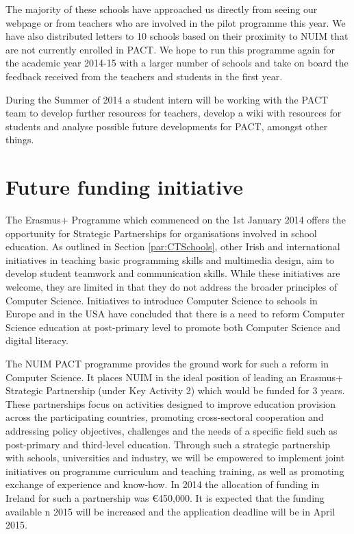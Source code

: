 \documentclass[a4paper]{article}
\begin{document}
The majority of these schools have approached us directly from seeing our webpage or from teachers who are involved in the pilot programme this year. We have also distributed letters to 10 schools based on their proximity to NUIM that are not currently enrolled in PACT. We hope to run this programme again for the academic year 2014-15 with a larger number of schools and take on board the feedback received from the teachers and students in the first year.

During the Summer of 2014 a student intern will be working with the PACT team to develop further resources for teachers, develop a wiki with resources for students and analyse possible future developments for PACT, amongst other things.


\section{Future funding initiative} \label{Sect:FutFunding}
The Erasmus+ Programme which commenced on the 1st January 2014 offers the opportunity for Strategic Partnerships for organisations involved in school education. As outlined in Section \ref{par:CTSchools}, other Irish and international initiatives in teaching basic programming skills and multimedia design, aim to develop student teamwork and communication skills. While these initiatives are welcome, they are limited in that they do not address the broader principles of Computer Science. Initiatives to introduce Computer Science to schools in Europe and in the USA have concluded that there is a need to reform Computer Science education at post-primary level to promote  both Computer Science and digital literacy. 

The NUIM PACT programme provides the ground work for such a reform in Computer Science. It places NUIM in the ideal position of leading an Erasmus+ Strategic Partnership (under Key Activity 2) which would be funded for 3 years. These partnerships focus on activities designed to improve education provision across the participating countries, promoting cross-sectoral cooperation and addressing policy objectives, challenges and the needs of a specific field such as post-primary and third-level education.  Through such a strategic partnership with schools, universities and industry, we will be empowered to implement joint initiatives on programme curriculum and teaching training, as well as promoting exchange of experience and know-how. In 2014 the allocation of funding in Ireland for such a partnership was \euro 450,000. It is expected that the funding available n 2015 will be increased and the application deadline will be in April 2015.  
\end{document}
